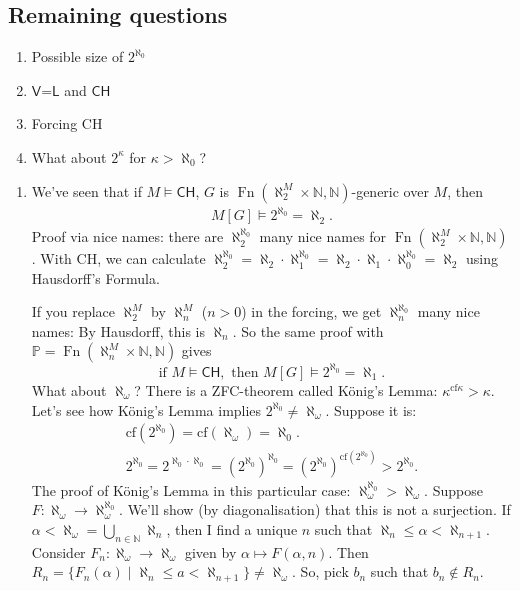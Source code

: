 \documentclass{article}
\newcommand{\p}{\mathbb{P}}
\newcommand{\1}{\mathbbm{1}}
\DeclareMathOperator{\Fn}{Fn}
\let\models\vDash
\begin{document}
\subsection{Remaining questions}
\begin{enumerate}
  \item Possible size of $2^{\aleph_0}$ \newlec
  \item $\textsf{V=L}$ and $\textsf{CH}$
  \item Forcing \textsf{CH}
  \item What about $2^\kappa$ for $\kappa > \aleph_0$?
\end{enumerate}
\begin{enumerate}
  \item We've seen that if $M \models \textsf{CH}$, $G$  is $\Fn(\aleph_2^M \times \mathbb{N}, \mathbb{N})$-generic over $M$, then
    \begin{align*}
      M[G] \models 2^{\aleph_0} = \aleph_2.
    \end{align*}
    Proof via nice names: there are $\aleph_2^{\aleph_0}$ many nice names for $\operatorname{Fn}(\aleph_2^M \times \mathbb{N}, \mathbb{N})$.
    With \textsf{CH}, we can calculate $\aleph_2^{\aleph_0} = \aleph_2 \cdot \aleph_1^{\aleph_0} = \aleph_2 \cdot \aleph_1 \cdot \aleph_0^{\aleph_0} = \aleph_2$ using Hausdorff's Formula.

    If you replace $\aleph_2^M$ by $\aleph_n^M$ ($n > 0$) in the forcing, we get $\aleph_n^{\aleph_0}$ many nice names: By Hausdorff, this is $\aleph_n$.
    So the same proof with $\p = \operatorname{Fn}(\aleph_n^M \times \mathbb{N}, \mathbb{N})$ gives
    \begin{equation*}
      \text{if } M \models \textsf{CH}, \text{ then } M[G] \models 2^{\aleph_0} = \aleph_1.
    \end{equation*}
    What about $\aleph_\omega$?
    There is a \textsf{ZFC}-theorem called K\"onig's Lemma: $\kappa^{\text{cf} \kappa} > \kappa$.
    Let's see how K\"onig's Lemma implies $2^{\aleph_0} \neq \aleph_\omega$.
    Suppose it is:
    \begin{gather*}
      \text{cf}(2^{\aleph_0}) = \text{cf}(\aleph_\omega) = \aleph_0. \\
      2^{\aleph_0} = 2^{\aleph_0 \cdot \aleph_0} = (2^{\aleph_0})^{\aleph_0} = (2^{\aleph_0})^{\text{cf}(2^{\aleph_0})} > 2^{\aleph_0}.
    \end{gather*}
    The proof of K\"onig's Lemma in this particular case: $\aleph_\omega^{\aleph_0} > \aleph_\omega$.
    Suppose $F: \aleph_\omega \to \aleph_\omega^{\aleph_0}$. We'll show (by diagonalisation) that this is not a surjection.
    If $\alpha < \aleph_\omega = \bigcup_{n \in \mathbb{N}} \aleph_n$, then I find a unique $n$ such that $\aleph_n \leq \alpha < \aleph_{n+1}$.
    Consider $F_n: \aleph_\omega \to \aleph_\omega$ given by $\alpha \mapsto F(\alpha,n)$.
    Then $R_n = \{F_n(\alpha) \mid \aleph_n \leq a < \aleph_{n+1}\} \neq \aleph_\omega$.
    So, pick $b_n$ such that $b_n \notin R_n$.


\end{enumerate}
\end{document}
